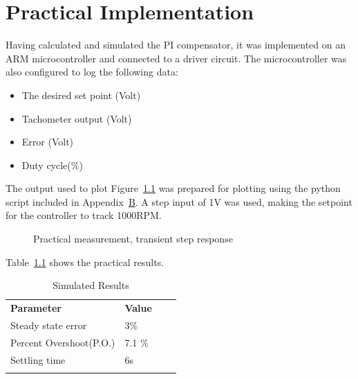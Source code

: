 \chapter{Practical Implementation}
Having calculated and simulated the PI compensator, it was implemented on an ARM microcontroller and connected to a driver circuit. The microcontroller was also configured to log the following data:
\begin{itemize}
	\item The desired set point (Volt)
	\item Tachometer output (Volt)
	\item Error (Volt)
	\item Duty cycle(\%)
\end{itemize}
The output used to plot Figure~\ref{fig:practrans} was prepared for plotting using the python script included in Appendix~\hyperref[apx:B]{B}. A step input of 1V was used, making the setpoint for the controller to track 1000RPM. 
\begin{figure}[h]

\caption{Practical measurement, transient step response}
	\label{fig:practrans}
\end{figure}
Table~\ref{tbl:measspec} shows the practical results.
\begin{table}[h]
\centering
\caption{Simulated Results}
\label{tbl:measspec}
\begin{tabular}{llll}
\cline{1-2}
\multicolumn{1}{|l|}{\textbf{Parameter}}      & \multicolumn{1}{l|}{\textbf{Value}} &  &  \\ \cline{1-2}
\multicolumn{1}{|l|}{Steady state error}    & \multicolumn{1}{l|}{3\%}                   &  &  \\ \cline{1-2}
\multicolumn{1}{|l|}{Percent Overshoot(P.O.)} & \multicolumn{1}{l|}{7.1 \%}                       &  &  \\ \cline{1-2}
\multicolumn{1}{|l|}{Settling time} & \multicolumn{1}{l|}{6s}                       &  &  \\ \cline{1-2}
                                              &                                             &  & 
\end{tabular}

\end{table}


